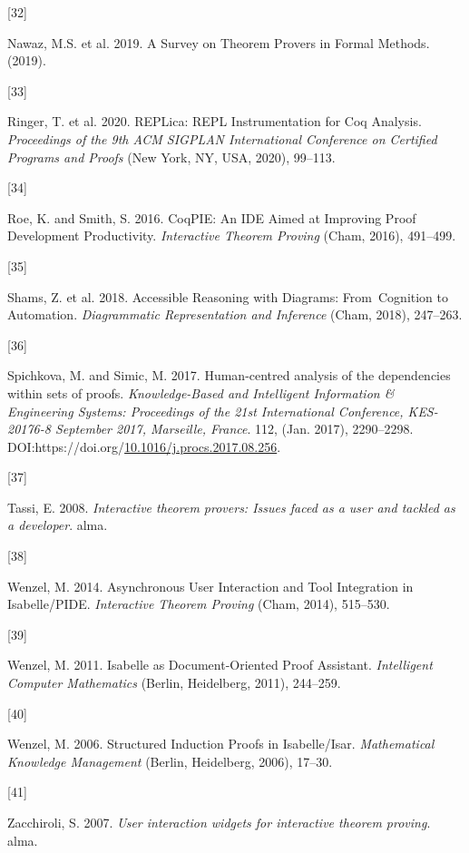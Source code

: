 \documentclass[
]{article}
\newlength{\cslhangindent}
\newlength{\csllabelwidth}
\newlength{\cslentryspacingunit} %
\newenvironment{CSLReferences}[2] %
 {%
  \setlength{\parindent}{0pt}
  \ifodd #1
  \let\oldpar\par
  \def\par{\hangindent=\cslhangindent\oldpar}
  \fi
  \setlength{\parskip}{#2\cslentryspacingunit}
 }%
 {}
\newcommand{\CSLLeftMargin}[1]{\parbox[t]{\csllabelwidth}{#1}}
\newcommand{\CSLRightInline}[1]{\parbox[t]{\linewidth - \csllabelwidth}{#1}\break}
\begin{document}
\begin{CSLReferences}{0}{0}
\leavevmode{}%
\CSLLeftMargin{{[}32{]} }
\CSLRightInline{Nawaz, M.S. et al. 2019. A {Survey} on {Theorem}
{Provers} in {Formal} {Methods}. (2019).}

\leavevmode{}%
\CSLLeftMargin{{[}33{]} }
\CSLRightInline{Ringer, T. et al. 2020. {REPLica}: {REPL}
{Instrumentation} for {Coq} {Analysis}. \emph{Proceedings of the 9th
{ACM} {SIGPLAN} {International} {Conference} on {Certified} {Programs}
and {Proofs}} (New York, NY, USA, 2020), 99--113.}

\leavevmode{}%
\CSLLeftMargin{{[}34{]} }
\CSLRightInline{Roe, K. and Smith, S. 2016. {CoqPIE}: {An} {IDE} {Aimed}
at {Improving} {Proof} {Development} {Productivity}. \emph{Interactive
{Theorem} {Proving}} (Cham, 2016), 491--499.}

\leavevmode{}%
\CSLLeftMargin{{[}35{]} }
\CSLRightInline{Shams, Z. et al. 2018. Accessible {Reasoning} with
{Diagrams}: {From}~{Cognition} to {Automation}. \emph{Diagrammatic
{Representation} and {Inference}} (Cham, 2018), 247--263.}

\leavevmode{}%
\CSLLeftMargin{{[}36{]} }
\CSLRightInline{Spichkova, M. and Simic, M. 2017. Human-centred analysis
of the dependencies within sets of proofs. \emph{Knowledge-Based and
Intelligent Information \& Engineering Systems: Proceedings of the 21st
International Conference, KES-20176-8 September 2017, Marseille,
France}. 112, (Jan. 2017), 2290--2298.
DOI:https://doi.org/\href{https://doi.org/10.1016/j.procs.2017.08.256}{10.1016/j.procs.2017.08.256}.}

\leavevmode{}%
\CSLLeftMargin{{[}37{]} }
\CSLRightInline{Tassi, E. 2008. \emph{Interactive theorem provers:
Issues faced as a user and tackled as a developer}. alma.}

\leavevmode{}%
\CSLLeftMargin{{[}38{]} }
\CSLRightInline{Wenzel, M. 2014. Asynchronous {User} {Interaction} and
{Tool} {Integration} in {Isabelle}/{PIDE}. \emph{Interactive {Theorem}
{Proving}} (Cham, 2014), 515--530.}

\leavevmode{}%
\CSLLeftMargin{{[}39{]} }
\CSLRightInline{Wenzel, M. 2011. Isabelle as {Document}-{Oriented}
{Proof} {Assistant}. \emph{Intelligent {Computer} {Mathematics}}
(Berlin, Heidelberg, 2011), 244--259.}

\leavevmode{}%
\CSLLeftMargin{{[}40{]} }
\CSLRightInline{Wenzel, M. 2006. Structured {Induction} {Proofs} in
{Isabelle}/{Isar}. \emph{Mathematical {Knowledge} {Management}} (Berlin,
Heidelberg, 2006), 17--30.}

\leavevmode{}%
\CSLLeftMargin{{[}41{]} }
\CSLRightInline{Zacchiroli, S. 2007. \emph{User interaction widgets for
interactive theorem proving}. alma.}

\end{CSLReferences}
\end{document}
